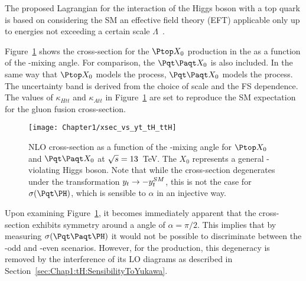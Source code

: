 The proposed Lagrangian for the interaction of the Higgs  boson with a top quark is 
based on considering the SM an effective field theory (EFT) applicable only
up to energies not exceeding a certain scale $\Lambda$~\cite{Grzadkowski:2010es}.

Figure~\ref{fig:Chap1:xsec_vs_yt_tH_ttH} shows the cross-section for the $\Ptop X_{0}$ production 
in the \tchannel as a function of the \CP-mixing angle. For comparison, the $\ttbar X_0$ is also included.
In the same way that $\Ptop X_{0}$ models the \tHq process, $\ttbar X_0$ models the \ttH process.
The uncertainty band is derived from the choice of scale and the FS dependence.
The values of $\kappa_{Htt}$ and $\kappa_{Att}$ in Figure~\ref{fig:Chap1:xsec_vs_yt_tH_ttH} 
are set to reproduce the SM expectation for the gluon fusion cross-section. 


\begin{figure}[h]
    \centering
    \texttt{[image: Chapter1/xsec\_vs\_yt\_tH\_ttH]}
    \caption{NLO cross-section as a function of the \CP-mixing angle for \tchannel $\Ptop X_{0}$ and $\ttbar X_0$
    at $\sqrt{s} = 13$~TeV. 
    The $X_0$ represents a general \CP-violating Higgs boson.
    Note that while the \ttH cross-section degenerates under the 
    transformation $y_{t} \rightarrow -y_{t}^{SM}$, this is not the case for $\sigma(\tH)$, which is sensible to $\alpha$ in an injective way.}
    \label{fig:Chap1:xsec_vs_yt_tH_ttH}
\end{figure}

Upon examining Figure~\ref{fig:Chap1:xsec_vs_yt_tH_ttH}, it becomes immediately 
apparent that the \ttH cross-section exhibits symmetry around a
 \CP angle of $\alpha = \pi/2$. This implies that by measuring 
$\sigma(\ttH)$ it would not be possible to discriminate between the
\CP-odd and \CP-even scenarios. However, for the \tHq production,
this degeneracy is removed by the interference of its LO diagrams as
described in Section~\ref{sec:Chap1:tH:SensibilityToYukawa}.
 


